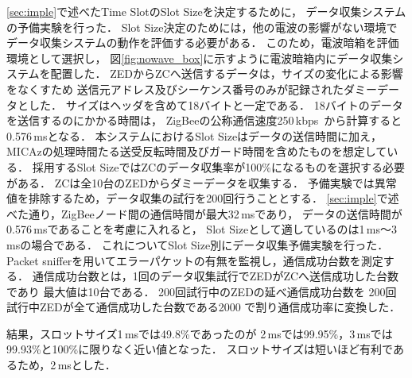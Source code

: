\documentclass[technicalreport]{ieicej}
\begin{document}
\ref{sec:imple}で述べたTime SlotのSlot Sizeを決定するために，
データ収集システムの予備実験を行った．
Slot Size決定のためには，他の電波の影響がない環境で
データ収集システムの動作を評価する必要がある．
このため，電波暗箱を評価環境として選択し，
図\ref{fig:nowave_box}に示すように電波暗箱内にデータ収集システムを配置した．
ZEDからZCへ送信するデータは，サイズの変化による影響をなくすため
送信元アドレス及びシーケンス番号のみが記録されたダミーデータとした．
サイズはヘッダを含めて18バイトと一定である．
18バイトのデータを送信するのにかかる時間は，
ZigBeeの公称通信速度250\,kbps~\cite{ZigBee04:}から計算すると
0.576\,msとなる．
本システムにおけるSlot Sizeはデータの送信時間に加え，
MICAzの処理時間たる送受反転時間及びガード時間を含めたものを想定している．
採用するSlot SizeではZCのデータ収集率が100\%になるものを選択する必要がある．
ZCは全10台のZEDからダミーデータを収集する．
予備実験では異常値を排除するため，データ収集の試行を200回行うこととする．
\ref{sec:imple}で述べた通り，ZigBeeノード間の通信時間が最大32\,msであり，
データの送信時間が0.576\,msであることを考慮に入れると，
Slot Sizeとして適しているのは1\,ms〜3\,msの場合である．
これについてSlot Size別にデータ収集予備実験を行った．
Packet snifferを用いてエラーパケットの有無を監視し，通信成功台数を測定する．
通信成功台数とは，1回のデータ収集試行でZEDがZCへ送信成功した台数であり
最大値は10台である．
200回試行中のZEDの延べ通信成功台数を
200回試行中ZEDが全て通信成功した台数である2000
で割り通信成功率に変換した．


結果，スロットサイズ1\,msでは49.8\%であったのが
2\,msでは99.95\%，3\,msでは99.93\%と100\%に限りなく近い値となった．
スロットサイズは短いほど有利であるため，2\,msとした．
\end{document}
